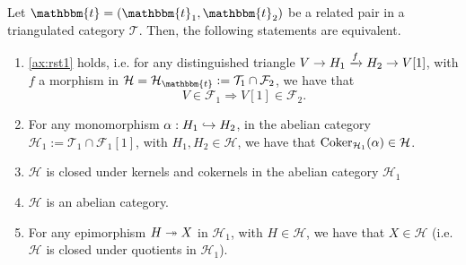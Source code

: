 \begin{thm}\label{thm:2.9}
  Let $\mathbbm{t}=(\mathbbm{t}_1,\mathbbm{t}_2)$ be a related pair in a triangulated
  category $\mathcal{T}$. Then, the following statements are equivalent.
  \begin{enumerate}[label=(\alph*)]
    \item \ref{ax:rst1} holds, i.e. for any distinguished triangle $V\to H_1\xrightarrow{f}H_2\to V[1]$, with
      $f$ a morphism in $\mathcal{H}=\mathcal{H}_\mathbbm{t}:=\mathcal{T}_1\cap\mathcal{F}_2$,
      we have that
      \begin{equation*}
        V\in\mathcal{F}_1 \Rightarrow V[1]\in\mathcal{F}_2.
      \end{equation*}
    \item For any monomorphism $\alpha:H_1\hookrightarrow H_2$, in the abelian category
      $\mathcal{H}_1:=\mathcal{T}_1\cap\mathcal{F}_1[1]$, with $H_1,H_2\in\mathcal{H}$,
      we have that $\operatorname{Coker}_{\mathcal{H}_1}(\alpha)\in\mathcal{H}$.
    \item $\mathcal{H}$ is closed under kernels and cokernels in the abelian category
      $\mathcal{H}_1$
    \item $\mathcal{H}$ is an abelian category.
    \item For any epimorphism $H\twoheadrightarrow X$ in $\mathcal{H}_1$, with $H\in\mathcal{H}$,
      we have that $X\in\mathcal{H}$ (i.e. $\mathcal{H}$ is closed under quotients in $\mathcal{H}_1$).
  \end{enumerate}
\end{thm}


